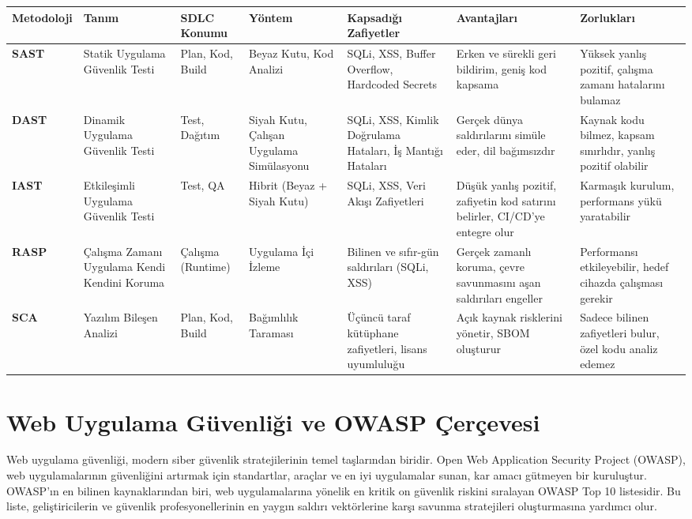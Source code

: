 \begin{adjustbox}{max width=\textwidth}
\begin{tabularx}{\textwidth}{|l|X|l|l|X|X|X|}
\hline
\textbf{Metodoloji} & \textbf{Tanım} & \textbf{SDLC Konumu} & \textbf{Yöntem} & \textbf{Kapsadığı Zafiyetler} & \textbf{Avantajları} & \textbf{Zorlukları} \\
\hline
\textbf{SAST} & Statik Uygulama Güvenlik Testi & Plan, Kod, Build & Beyaz Kutu, Kod Analizi & SQLi, XSS, Buffer Overflow, Hardcoded Secrets & Erken ve sürekli geri bildirim, geniş kod kapsama & Yüksek yanlış pozitif, çalışma zamanı hatalarını bulamaz \\
\hline
\textbf{DAST} & Dinamik Uygulama Güvenlik Testi & Test, Dağıtım & Siyah Kutu, Çalışan Uygulama Simülasyonu & SQLi, XSS, Kimlik Doğrulama Hataları, İş Mantığı Hataları & Gerçek dünya saldırılarını simüle eder, dil bağımsızdır & Kaynak kodu bilmez, kapsam sınırlıdır, yanlış pozitif olabilir \\
\hline
\textbf{IAST} & Etkileşimli Uygulama Güvenlik Testi & Test, QA & Hibrit (Beyaz + Siyah Kutu) & SQLi, XSS, Veri Akışı Zafiyetleri & Düşük yanlış pozitif, zafiyetin kod satırını belirler, CI/CD'ye entegre olur & Karmaşık kurulum, performans yükü yaratabilir \\
\hline
\textbf{RASP} & Çalışma Zamanı Uygulama Kendi Kendini Koruma & Çalışma (Runtime) & Uygulama İçi İzleme & Bilinen ve sıfır-gün saldırıları (SQLi, XSS) & Gerçek zamanlı koruma, çevre savunmasını aşan saldırıları engeller & Performansı etkileyebilir, hedef cihazda çalışması gerekir \\
\hline
\textbf{SCA} & Yazılım Bileşen Analizi & Plan, Kod, Build & Bağımlılık Taraması & Üçüncü taraf kütüphane zafiyetleri, lisans uyumluluğu & Açık kaynak risklerini yönetir, SBOM oluşturur & Sadece bilinen zafiyetleri bulur, özel kodu analiz edemez \\
\hline
\end{tabularx}
\end{adjustbox}

\section{Web Uygulama Güvenliği ve OWASP Çerçevesi}

Web uygulama güvenliği, modern siber güvenlik stratejilerinin temel taşlarından biridir. Open Web Application Security Project (OWASP), web uygulamalarının güvenliğini artırmak için standartlar, araçlar ve en iyi uygulamalar sunan, kar amacı gütmeyen bir kuruluştur. OWASP'ın en bilinen kaynaklarından biri, web uygulamalarına yönelik en kritik on güvenlik riskini sıralayan OWASP Top 10 listesidir. Bu liste, geliştiricilerin ve güvenlik profesyonellerinin en yaygın saldırı vektörlerine karşı savunma stratejileri oluşturmasına yardımcı olur.

